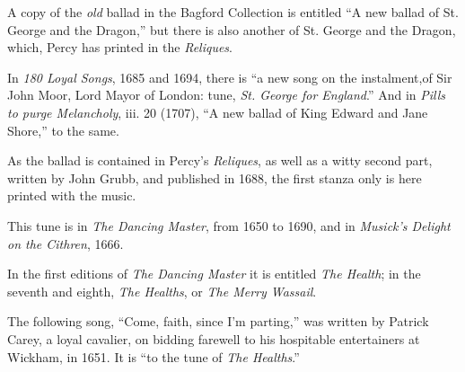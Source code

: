A copy of the \textit{old} ballad in the Bagford Collection is entitled “A new ballad
of St. George and the Dragon,” but there is also another of St. George and the
Dragon, which, Percy has printed in the \textit{Reliques}.

In \textit{180 Loyal Songs}, 1685 and 1694, there is “a new song on the instalment,of
Sir John Moor, Lord Mayor of London: tune, \textit{St. George for England}.” And in
\textit{Pills to purge Melancholy}, iii. 20 (1707), “A new ballad of King Edward and
Jane Shore,” to the same.
\pagebreak

As the ballad is contained in Percy’s \textit{Reliques}, as well as a witty second part,
written by John Grubb, and published in 1688, the first stanza only is here
printed with the music.


\pagebreak


This tune is in \textit{The Dancing Master}, from 1650 to 1690, and in \textit{Musick’s
Delight on the Cithren}, 1666.

In the first editions of \textit{The Dancing Master} it is entitled \textit{The Health}; in the
seventh and eighth, \textit{The Healths}, or \textit{The Merry Wassail}.

The following song, “Come, faith, since I’m parting,” was written by Patrick
Carey, a loyal cavalier, on bidding farewell to his hospitable entertainers at Wickham, 
in 1651. It is “to the tune of \textit{The Healths}.”




